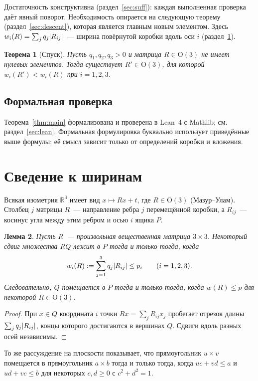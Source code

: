 \documentclass[11pt]{article}
\newtheorem{theorem}{Теорема}[section]
\newtheorem{lemma}[theorem]{Лемма}
\theoremstyle{definition}
\theoremstyle{remark}
\newcommand{\R}{\mathbb{R}}
\newcommand{\Ort}{\mathrm{O}(3)}
\DeclarePairedDelimiter{\abs}{\lvert}{\rvert}
\begin{document}
Достаточность конструктивна (раздел~\ref{sec:suff}): каждая выполненная проверка даёт явный поворот.
Необходимость опирается на следующую теорему (раздел~\ref{sec:descent}), которая является главным
новым элементом. Здесь $w_i(R)=\sum_j q_j\abs{R_{ij}}$~--- ширина повёрнутой коробки вдоль оси $i$
(раздел~\ref{sec:widths}).

\begin{theorem}[Спуск]\label{thm:Z}
Пусть $q_1,q_2,q_3>0$ и матрица $R\in\Ort$ не имеет нулевых элементов. Тогда существует $R'\in\Ort$,
для которой $w_i(R')<w_i(R)$ при $i=1,2,3$.
\end{theorem}

\subsection*{Формальная проверка}
Теорема~\ref{thm:main} формализована и проверена в Lean~4 с Mathlib; см. раздел~\ref{sec:lean}.
Формальная формулировка буквально использует приведённые выше формулы; её смысл зависит только от
определений коробки и вложения.

\section{Сведение к ширинам}\label{sec:widths}

Всякая изометрия $\R^3$ имеет вид $x\mapsto Rx+t$, где $R\in\Ort$ (Мазур--Улам). Столбец $j$
матрицы $R$~--- направление ребра $j$ перемещённой коробки, а $R_{ij}$~--- косинус угла между этим
ребром и осью $i$ ящика $P$.

\begin{lemma}\label{lem:widths}
Пусть $R$~--- произвольная вещественная матрица $3\times3$. Некоторый сдвиг множества $RQ$ лежит в $P$
тогда и только тогда, когда
\[
w_i(R):=\sum_{j=1}^3 q_j\abs{R_{ij}}\le p_i\qquad(i=1,2,3).
\]
Следовательно, $Q$ помещается в $P$ тогда и только тогда, когда $w(R)\le p$ для некоторой $R\in\Ort$.
\end{lemma}

\begin{proof}
При $x\in Q$ координата $i$ точки $Rx=\sum_j R_{ij}x_j$ пробегает отрезок длины
$\sum_j q_j\abs{R_{ij}}$, концы которого достигаются в вершинах $Q$. Сдвиги вдоль разных осей
независимы.
\end{proof}

То же рассуждение на плоскости показывает, что прямоугольник $u\times v$ помещается в прямоугольник
$a\times b$ тогда и только тогда, когда $uc+vd\le a$ и $ud+vc\le b$ для некоторых $c,d\ge0$ с
$c^2+d^2=1$.
\end{document}
